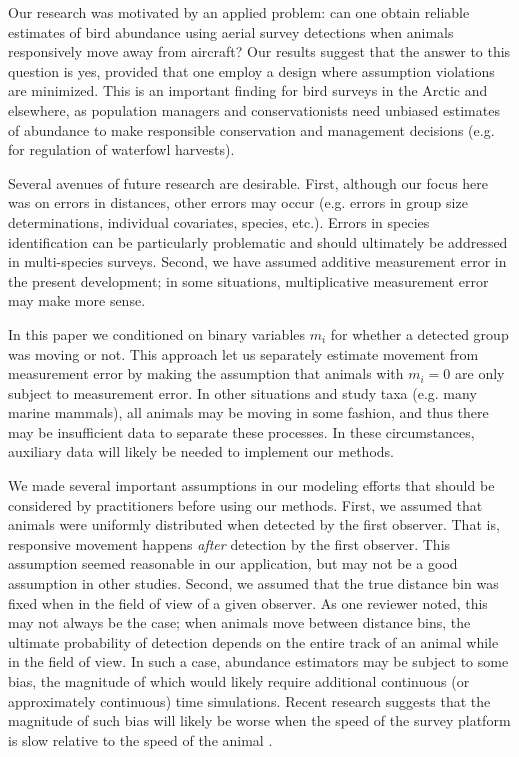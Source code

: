 \documentclass[aoas,preprint]{imsart}
\numberwithin{equation}{section}
\theoremstyle{plain}
\begin{document}
Our research was motivated by an applied problem: can one obtain reliable estimates of bird abundance using aerial survey detections when animals responsively move away from aircraft?  Our results suggest that the answer to this question is yes, provided that one employ a design where assumption violations are minimized.  This is an important finding for bird surveys in the Arctic and elsewhere, as population managers and conservationists need unbiased estimates of abundance to make responsible conservation and management decisions (e.g. for regulation of waterfowl harvests).

Several avenues of future research are desirable.  First, although our focus here was on errors in distances, other errors may occur (e.g. errors in group size determinations, individual covariates, species, etc.).  Errors in species identification can be particularly problematic \citep[e.g.][]{ConnEtAl2014} and should ultimately be addressed in multi-species surveys.  Second, we have assumed additive measurement error in the present development; in some situations, multiplicative measurement error \citep[whereby animals farther away are subject to greater measurement error;][]{BorchersEtAl2010} may make more sense.

In this paper we conditioned on binary variables $m_i$ for whether a detected group was moving or not. This approach let us separately estimate movement from measurement error by making the assumption that animals with $m_i=0$ are only subject to measurement error.  In other situations and study taxa (e.g. many marine mammals), all animals may be moving in some fashion, and thus there may be insufficient data to separate these processes.  In these circumstances, auxiliary data \citep[e.g. animals with known location to estimate measurement error; cf.][]{BorchersEtAl2010} will likely be needed to implement our methods.

We made several important assumptions in our modeling efforts that should be considered by practitioners before using our methods.  First, we assumed that animals were uniformly distributed when detected by the first observer.  That is, responsive movement happens \textit{after} detection by the first observer.  This assumption seemed reasonable in our application, but may not be a good assumption in other studies.  Second, we assumed that the true distance bin was fixed when in the field of view of a given observer.  As one reviewer noted, this may not always be the case; when animals move between distance bins, the ultimate probability of detection depends on the entire track of an animal while in the field of view. In such a case, abundance estimators may be subject to some bias, the magnitude of which would likely require additional continuous (or approximately continuous) time simulations.  Recent research suggests that the magnitude of such bias will likely be worse when the speed of the survey platform is slow relative to the speed of the animal \citep{GlennieEtAl2015}.
\end{document}
